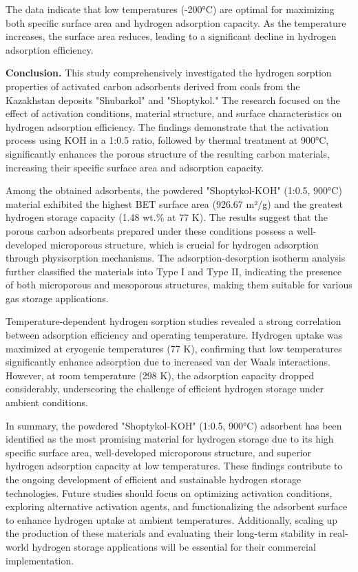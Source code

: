 \begin{multicols}{2}
The data indicate that low temperatures (-200°C) are optimal for
maximizing both specific surface area and hydrogen adsorption capacity.
As the temperature increases, the surface area reduces, leading to a
significant decline in hydrogen adsorption efficiency.

{\bfseries Conclusion.} This study comprehensively investigated the
hydrogen sorption properties of activated carbon adsorbents derived from
coals from the Kazakhstan deposits "Shubarkol" and "Shoptykol." The
research focused on the effect of activation conditions, material
structure, and surface characteristics on hydrogen adsorption
efficiency. The findings demonstrate that the activation process using
KOH in a 1:0.5 ratio, followed by thermal treatment at 900°C,
significantly enhances the porous structure of the resulting carbon
materials, increasing their specific surface area and adsorption
capacity.

Among the obtained adsorbents, the powdered "Shoptykol-KOH" (1:0.5,
900°C) material exhibited the highest BET surface area (926.67 m²/g) and
the greatest hydrogen storage capacity (1.48 wt.\% at 77 K). The results
suggest that the porous carbon adsorbents prepared under these
conditions possess a well-developed microporous structure, which is
crucial for hydrogen adsorption through physisorption mechanisms. The
adsorption-desorption isotherm analysis further classified the materials
into Type I and Type II, indicating the presence of both microporous and
mesoporous structures, making them suitable for various gas storage
applications.

Temperature-dependent hydrogen sorption studies revealed a strong
correlation between adsorption efficiency and operating temperature.
Hydrogen uptake was maximized at cryogenic temperatures (77 K),
confirming that low temperatures significantly enhance adsorption due to
increased van der Waals interactions. However, at room temperature (298
K), the adsorption capacity dropped considerably, underscoring the
challenge of efficient hydrogen storage under ambient conditions.

In summary, the powdered "Shoptykol-KOH" (1:0.5, 900°C) adsorbent has
been identified as the most promising material for hydrogen storage due
to its high specific surface area, well-developed microporous structure,
and superior hydrogen adsorption capacity at low temperatures. These
findings contribute to the ongoing development of efficient and
sustainable hydrogen storage technologies. Future studies should focus
on optimizing activation conditions, exploring alternative activation
agents, and functionalizing the adsorbent surface to enhance hydrogen
uptake at ambient temperatures. Additionally, scaling up the production
of these materials and evaluating their long-term stability in
real-world hydrogen storage applications will be essential for their
commercial implementation.


\end{multicols}
